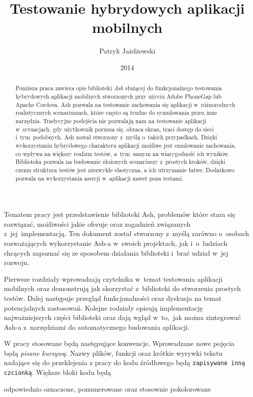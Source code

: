 \documentclass{xmgr}
\author   {Patryk Jażdżewski}
\title    {Testowanie hybrydowych aplikacji mobilnych}
\date     {2014}
\begin{document}
\begin{abstract}

  Poniższa praca zawiera opis biblioteki \textit{Ash} służącej do funkcjonalnego testowania
hybrydowych aplikacji mobilnych stworzonych przy użyciu Adobe PhoneGap lub
Apache Cordova. Ash pozwala na testowanie zachowania się aplikacji w~różnorodnych
realistycznych scenariuszach, które często są trudne do symulowania przez inne narzędzia. Tradycyjne podejścia nie pozwalają nam na testowanie aplikacji w~sytuacjach, gdy  użytkownik porusza się,
obraca ekran, traci dostęp do sieci i~tym~podobnych. Ash został stworzony z~myślą o~takich przypadkach. Dzięki wykorzystaniu hybrydowego charakteru aplikacji
możliwe jest emulowanie zachowania, co wpływa na większy realizm testów, a~tym~samym na wiarygodność ich wyników. 
Biblioteka pozwala na budowanie złożonych scenariuszy z~prostych kroków, dzięki czemu struktura testów jest niezwykle elastyczna, a ich utrzymanie łatwe. 
Dodatkowo pozwala na wykorzystania asercji w~aplikacji nawet poza testami. 

\end{abstract}

\maketitle

\introduction

Tematem pracy jest przedstawienie biblioteki Ash, problemów które stara się rozwiązać, możliwości jakie oferuje oraz zagadnień związanych z~jej~implementacją. Ten dokument  został stworzony z~myślą zarówno o~osobach rozważających wykorzystanie Ash-a w~swoich projektach, jak i~o~ludziach chcących zapoznać się ze sposobem działania biblioteki i~brać udział w~jej rozwoju.  

Pierwsze rozdziały wprowadzają czytelnika w~temat testowania aplikacji mobilnych oraz demonstrują jak skorzystać z~biblioteki do stworzenia prostych testów. Dalej następuje przegląd funkcjonalności oraz dyskusja na temat potencjalnych zastosowań. Kolejne rodziały opisują implementację najważniejszych części biblioteki oraz dają wgląd w~to,~jak można zintegrować Ash-a z~narzędziami do automatycznego budowania aplikacji.

W pracy stosowane będą następujące konwencje. Wprowadzane nowe pojęcia będą \textit{pisane kursywą}. Nazwy plików, funkcji oraz krótkie wyrywki tekstu nadające się do przeklejenia z pracy do kodu źródłowego będą \texttt{zapisywane inną czcionką}. Większe bloki kodu będą 
\begin{javascriptcode}
    odpowiednio oznaczone, 
    ponumerowane oraz 
    stosownie pokolorowane
\end{javascriptcode}
\end{document}
